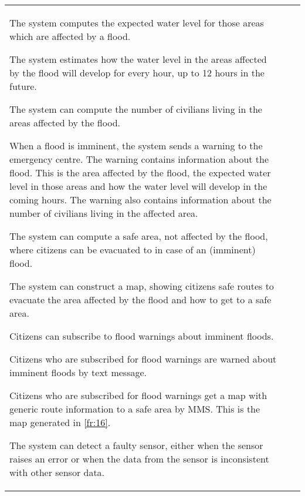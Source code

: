 \begin{longtable}{L{0.1\textwidth} L{0.12\textwidth} L{0.78\textwidth}}
    { The system computes the expected water level for those areas which are affected by a flood. }
    
    { The system estimates how the water level in the areas affected by the flood will develop for every hour, up to 12 hours in the future. } %
    
    { The system can compute the number of civilians living in the areas affected by the flood. }
    
	{ When a flood is imminent, the system sends a warning to the emergency centre. The warning contains information about the flood. This is the area affected by the flood, the expected water level in those areas and how the water level will develop in the coming hours. The warning also contains information about the number of civilians living in the affected area. }
    
    { The system can compute a safe area, not affected by the flood, where citizens can be evacuated to in case of an (imminent) flood. }
    
    { The system can construct a map, showing citizens safe routes to evacuate the area affected by the flood and how to get to a safe area. }
    
    { Citizens can subscribe to flood warnings about imminent floods. }
    
    { Citizens who are subscribed for flood warnings are warned about imminent floods by text message. }
    
    { Citizens who are subscribed for flood warnings get a map with generic route information to a safe area by MMS. This is the map generated in \ref{fr:16}. }
	
    { The system can detect a faulty sensor, either when the sensor raises an error or when the data from the sensor is inconsistent with other sensor data. }
    

\end{longtable}
